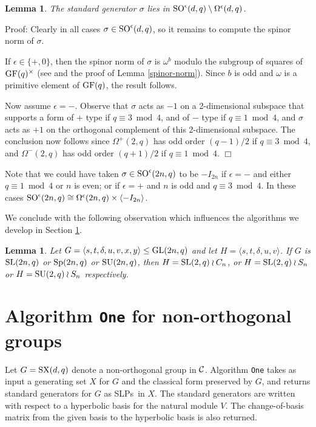 \documentclass[12pt]{article}
\newtheorem{lemma}[definition]{Lemma}
\newenvironment{proof}{\normalsize {\sc Proof}:}{{\hfill $\Box$ \\}}
\def\SL{{\rm SL}}
\def\SO{{\rm SO}}
\def\GL{{\rm GL}}
\def\C{{\cal C}}
\def\GF{{\rm GF}}
\def\Sp{{\rm Sp}}
\def\SU{{\rm SU}}
\def\SX{{\rm SX}}
\def\SLPs{{\rm SLPs}}
\def\w{\sigma} %
\begin{document}
\begin{lemma} \label{spinor-1}
The standard generator $\w$ lies in 
$\SO^\epsilon(d,q)\setminus\Omega^\epsilon(d,q)$.
\end{lemma}
\begin{proof}
Clearly in all cases $\w\in\SO^\epsilon(d,q)$, so it remains to
compute the spinor norm of $\w$.

If $\epsilon \in \{+,0\}$, then the spinor norm of $\w$ is
$\omega^b$ modulo the subgroup of squares 
of $\GF(q)^\times$ (see \cite{Zassenhaus} and 
the proof of Lemma \ref{spinor-norm}).
Since $b$ is odd and $\omega$ is a primitive element of $\GF(q)$, 
the result follows.

Now assume $\epsilon = -$.
Observe that $\w$ acts as $-1$ on 
a 2-dimensional subspace that 
supports a form of $+$ type if $q\equiv3\bmod4$, and 
of $-$ type if $q\equiv1\bmod4$, and $\w$ acts as $+1$ on 
the orthogonal complement of this 2-dimensional subspace.
The conclusion now follows since 
$\Omega^+(2,q)$ has odd
order $(q-1)/2$ if $q\equiv3\bmod 4$, 
and $\Omega^-(2, q)$ has 
odd order $(q+1)/2$ if $q\equiv 1\bmod4$.
\end{proof}

Note that we could have 
taken $\w\in\SO^\epsilon(2n,q)$ to be $-I_{2n}$ if $\epsilon=-$ and 
either $q\equiv1\bmod4$ or $n$ is even; or if 
$\epsilon=+$ and $n$ is odd and $q\equiv3\bmod 4$.
In these cases
$\SO^\epsilon(2n,q)\cong\Omega^\epsilon(2n,q)\times\langle-I_{2n}\rangle$.

We conclude with the following observation
which influences the algorithms we develop in Section \ref{Alg1}.
\begin{lemma} \label{wr2}
Let $G=\langle s,t,\delta,u,v,x,y\rangle \leq \GL(2n, q)$  
and let $H=\langle s,t,\delta,u,v\rangle$.
If $G$ is $\SL(2n, q)$ or $\Sp(2n,q)$ or $\SU(2n, q)$, then 
$H=\SL(2,q)\wr C_n$, or $H=\SL(2,q)\wr S_n$ or $H=\SU(2,q)\wr S_n$ respectively.
\end{lemma}

\section{Algorithm {\tt One} for non-orthogonal groups}
\label{Alg1}

Let $G=\SX(d, q)$ denote a non-orthogonal group in $\C$.
Algorithm {\tt One} takes as input a generating set $X$ for
$G$ and the classical form preserved by $G$, and returns standard 
generators for $G$ as \SLPs\ in $X$.
The standard generators are written 
with respect to a hyperbolic basis for the natural
module $V$.  The change-of-basis matrix from the given basis to 
the hyperbolic basis is also returned.
\end{document}
